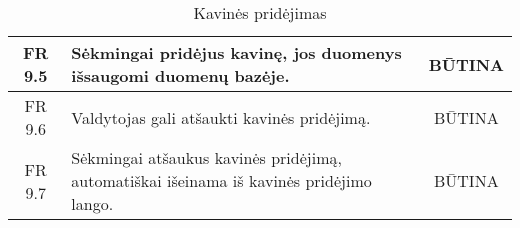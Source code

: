 \documentclass{VUMIFPSkursinis}
\begin{document}
\begin{center}
\begin{table}[H]
\begin{tabular}{|p{2cm}|p{}|p{}|}
	\hline
		\multicolumn{1}{|c|}{FR 9.5}&
		{Sėkmingai pridėjus kavinę, jos duomenys išsaugomi duomenų bazėje.}&
		\multicolumn{1}{|c|}{BŪTINA}\\	

	\hline
		\multicolumn{1}{|c|}{FR 9.6}&
		{Valdytojas gali atšaukti kavinės pridėjimą.}&
		\multicolumn{1}{|c|}{BŪTINA}\\	

	\hline
		\multicolumn{1}{|c|}{FR 9.7}&
		{Sėkmingai atšaukus kavinės pridėjimą, automatiškai išeinama iš kavinės pridėjimo lango.}&
		\multicolumn{1}{|c|}{BŪTINA}\\	

	\hline
	
	
	
	\end{tabular}
	\caption{Kavinės pridėjimas}
	\label{table:KavinėsPridėjimas}		
	\end{table}

\end{center}
\end{document}
